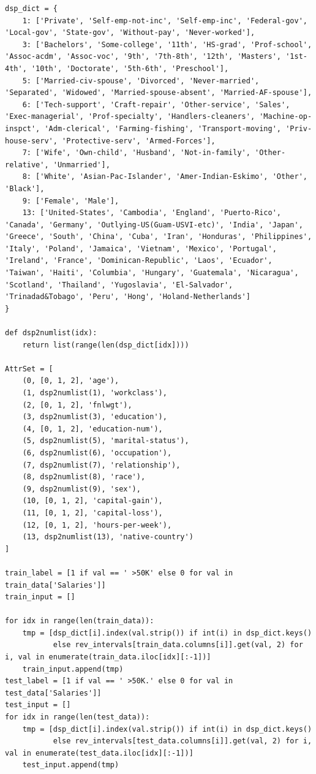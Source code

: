 \documentclass[a4paper, 11pt]{article}
\begin{document}
\begin{lstlisting}
dsp_dict = {
    1: ['Private', 'Self-emp-not-inc', 'Self-emp-inc', 'Federal-gov', 'Local-gov', 'State-gov', 'Without-pay', 'Never-worked'],
    3: ['Bachelors', 'Some-college', '11th', 'HS-grad', 'Prof-school', 'Assoc-acdm', 'Assoc-voc', '9th', '7th-8th', '12th', 'Masters', '1st-4th', '10th', 'Doctorate', '5th-6th', 'Preschool'],
    5: ['Married-civ-spouse', 'Divorced', 'Never-married', 'Separated', 'Widowed', 'Married-spouse-absent', 'Married-AF-spouse'],
    6: ['Tech-support', 'Craft-repair', 'Other-service', 'Sales', 'Exec-managerial', 'Prof-specialty', 'Handlers-cleaners', 'Machine-op-inspct', 'Adm-clerical', 'Farming-fishing', 'Transport-moving', 'Priv-house-serv', 'Protective-serv', 'Armed-Forces'],
    7: ['Wife', 'Own-child', 'Husband', 'Not-in-family', 'Other-relative', 'Unmarried'],
    8: ['White', 'Asian-Pac-Islander', 'Amer-Indian-Eskimo', 'Other', 'Black'],
    9: ['Female', 'Male'],
    13: ['United-States', 'Cambodia', 'England', 'Puerto-Rico', 'Canada', 'Germany', 'Outlying-US(Guam-USVI-etc)', 'India', 'Japan', 'Greece', 'South', 'China', 'Cuba', 'Iran', 'Honduras', 'Philippines', 'Italy', 'Poland', 'Jamaica', 'Vietnam', 'Mexico', 'Portugal', 'Ireland', 'France', 'Dominican-Republic', 'Laos', 'Ecuador', 'Taiwan', 'Haiti', 'Columbia', 'Hungary', 'Guatemala', 'Nicaragua', 'Scotland', 'Thailand', 'Yugoslavia', 'El-Salvador', 'Trinadad&Tobago', 'Peru', 'Hong', 'Holand-Netherlands']
}

def dsp2numlist(idx):
    return list(range(len(dsp_dict[idx])))

AttrSet = [
    (0, [0, 1, 2], 'age'),
    (1, dsp2numlist(1), 'workclass'),
    (2, [0, 1, 2], 'fnlwgt'),
    (3, dsp2numlist(3), 'education'),
    (4, [0, 1, 2], 'education-num'),
    (5, dsp2numlist(5), 'marital-status'),
    (6, dsp2numlist(6), 'occupation'),
    (7, dsp2numlist(7), 'relationship'),
    (8, dsp2numlist(8), 'race'),
    (9, dsp2numlist(9), 'sex'),
    (10, [0, 1, 2], 'capital-gain'),
    (11, [0, 1, 2], 'capital-loss'),
    (12, [0, 1, 2], 'hours-per-week'),
    (13, dsp2numlist(13), 'native-country')
]

train_label = [1 if val == ' >50K' else 0 for val in train_data['Salaries']]
train_input = []

for idx in range(len(train_data)):
    tmp = [dsp_dict[i].index(val.strip()) if int(i) in dsp_dict.keys()
           else rev_intervals[train_data.columns[i]].get(val, 2) for i, val in enumerate(train_data.iloc[idx][:-1])]
    train_input.append(tmp)
test_label = [1 if val == ' >50K.' else 0 for val in test_data['Salaries']]
test_input = []
for idx in range(len(test_data)):
    tmp = [dsp_dict[i].index(val.strip()) if int(i) in dsp_dict.keys()
           else rev_intervals[test_data.columns[i]].get(val, 2) for i, val in enumerate(test_data.iloc[idx][:-1])]
    test_input.append(tmp)


\end{lstlisting}
\end{document}
